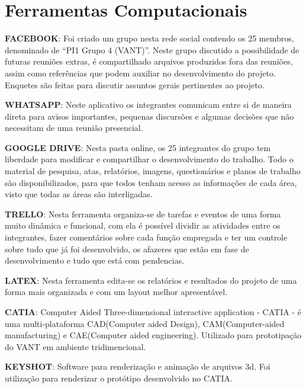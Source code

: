 \section{Ferramentas Computacionais}

\textbf{FACEBOOK}:
Foi criado um grupo nesta rede social contendo os 25 membros, denominado de “PI1 Grupo 4 (VANT)”. Neste grupo discutido a possibilidade de futuras reuniões extras, é compartilhado arquivos produzidos fora das reuniões, assim como referências que podem auxiliar no desenvolvimento do projeto. Enquetes são feitas para discutir assuntos gerais pertinentes ao projeto. 

\textbf{WHATSAPP}: 
Neste aplicativo os integrantes comunicam entre si de maneira direta para avisos importantes, pequenas discursões e algumas decisões que não necessitam de uma reunião presencial.

\textbf{GOOGLE DRIVE}: 
Nesta pasta online, os 25 integrantes do grupo tem liberdade para modificar e compartilhar o desenvolvimento do trabalho. Todo o material de pesquisa, atas, relatórios, imagens, questionários e planos de trabalho são disponibilizados, para que todos tenham acesso as informações de cada área, visto que todas as áreas são interligadas.

\textbf{TRELLO}:
Nesta ferramenta organiza-se de tarefas e eventos de uma forma muito dinâmica e funcional, com ela é possível dividir as atividades entre os integrantes, fazer comentários sobre cada função empregada e ter um controle sobre tudo que já foi desenvolvido, os afazeres que estão em fase de desenvolvimento e tudo que está com pendencias.

\textbf{LATEX}:
Nesta ferramenta edita-se os relatórios e resultados do projeto de uma forma mais organizada e com um layout melhor apresentável.

\textbf{CATIA}:
Computer Aided Three-dimensional interactive application - CATIA - é uma multi-plataforma CAD(Computer aided Design), CAM(Computer-aided manufacturing) e CAE(Computer aided engineering). Utilizado para prototipação do VANT em ambiente tridimencional.

\textbf{KEYSHOT}:
Software para renderização e animação de arquivos 3d. Foi utilização para renderizar o protótipo desenvolvido no CATIA.

